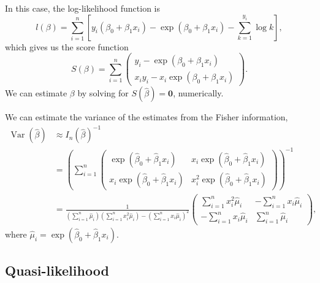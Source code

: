 \documentclass[letterpaper,11pt]{article}
\begin{document}
\begin{enumerate}
\begin{description}
    In this case, the log-likelihood function is
    \begin{equation}
      l\left(\beta\right) =
      \sum_{i=1}^n\left[
        y_i\left(\beta_0 + \beta_1x_i\right) -
        \exp\left(\beta_0 + \beta_1x_i\right) -
        \sum_{k=1}^{y_i}\log k
      \right],
    \end{equation}
    which gives us the score function
    \begin{equation}
      S\left(\beta\right) = \sum_{i=1}^n\begin{pmatrix}
        y_i - \exp\left(\beta_0 + \beta_1x_i\right) \\
        x_iy_i - x_i\exp\left(\beta_0 + \beta_1x_i\right)
      \end{pmatrix}.
      \label{eqn:p1_score_function}
    \end{equation}
    We can estimate $\beta$ by solving for
    $S\left(\hat{\beta}\right) = \mathbf{0}$, numerically.

    We can estimate the variance of the estimates from the Fisher information,
    \begin{align}
      \operatorname{Var}\left(
      \hat{\beta}
      \right)
      &\approx
        I_n\left(\hat{\beta}\right)^{-1} \label{eqn:p2_beta_hat_variance}\\
      &= \left(
        \sum_{i=1}^n\begin{pmatrix}
          \exp\left(\hat{\beta}_0 + \hat{\beta}_1x_i\right) &
          x_i\exp\left(\hat{\beta}_0 + \hat{\beta}_1x_i\right) \\
          x_i\exp\left(\hat{\beta}_0 + \hat{\beta}_1x_i\right) &
          x_i^2\exp\left(\hat{\beta}_0 + \hat{\beta}_1x_i\right)
        \end{pmatrix} \right)^{-1}  \nonumber\\
      &= \frac{1}{
        \left(\sum_{i=1}^n \hat{\mu}_i\right)\left(\sum_{i=1}^n x_i^2\hat{\mu}_i\right)
        - \left(\sum_{i=1}^n x_i\hat{\mu}_i\right)^2}
        \begin{pmatrix}
          \sum_{i=1}^n x_i^2\hat{\mu}_i &
          -\sum_{i=1}^n x_i\hat{\mu}_i \\
          -\sum_{i=1}^n x_i\hat{\mu}_i &
          \sum_{i=1}^n \hat{\mu}_i
        \end{pmatrix}, \nonumber
    \end{align}
    where $\hat{\mu}_i = \exp\left(\hat{\beta}_0 + \hat{\beta}_1x_i\right)$.
    
    \subsection*{Quasi-likelihood}


\end{description}
\end{enumerate}
\end{document}
